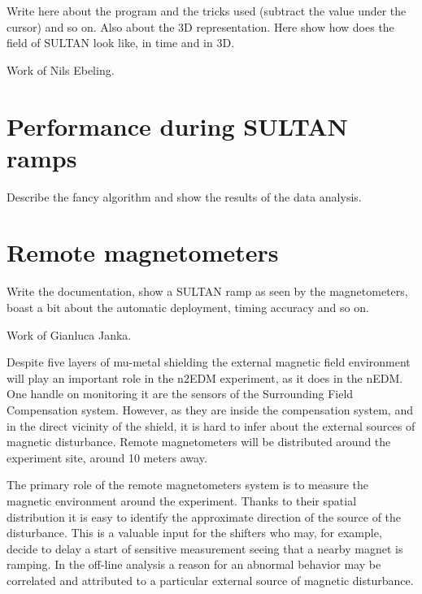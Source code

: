 Write here about the program and the tricks used (subtract the value under the cursor) and so on. Also about the 3D representation. Here show how does the field of SULTAN look like, in time and in 3D.

Work of Nils Ebeling.


\section{Performance during SULTAN ramps}
Describe the fancy algorithm and show the results of the data analysis.



\section{Remote magnetometers}
Write the documentation, show a SULTAN ramp as seen by the magnetometers, boast a bit about the automatic deployment, timing accuracy and so on.

Work of Gianluca Janka.

Despite five layers of mu-metal shielding the external magnetic field environment will play an important role in the n2EDM experiment, as it does in the nEDM. One handle on monitoring it are the sensors of the Surrounding Field Compensation system. However, as they are inside the compensation system, and in the direct vicinity of the shield, it is hard to infer about the external sources of magnetic disturbance. Remote magnetometers will be distributed around the experiment site, around 10 meters away.

The primary role of the remote magnetometers system is to measure the magnetic environment around the experiment. Thanks to their spatial distribution it is easy to identify the approximate direction of the source of the disturbance. This is a valuable input for the shifters who may, for example, decide to delay a start of sensitive measurement seeing that a nearby magnet is ramping. In the off-line analysis a reason for an abnormal behavior may be correlated and attributed to a particular external source of magnetic disturbance.

